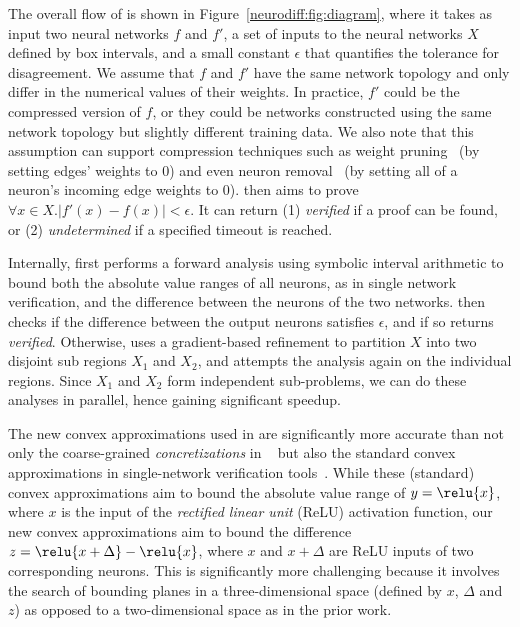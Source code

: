 The overall flow of \Name{} is shown in Figure~\ref{neurodiff:fig:diagram},
where it takes as input two neural networks $ f $ and $ f' $, a set of
inputs to the neural networks $ X $ defined by box intervals, and a small
constant $ \epsilon $ that quantifies the tolerance for disagreement. We assume
that $ f $ and $ f' $ have the same network topology and only differ in the
numerical values of their weights. In practice, $ f' $ could be the compressed
version of $ f $, or they could be networks constructed using the same network
topology but slightly different training data. We also note that this
assumption can support compression techniques such as weight
pruning~\cite{HanMD16} (by setting edges' weights to 0) and even neuron
removal~\cite{gokulanathan2019simplifying} (by setting all of a neuron's
incoming edge weights to 0). \Name{} then aims to prove $
\forall
x \in X. |f'(x) - f(x)| < \epsilon $. It can return
(1) \emph{verified} if a proof can be found, or
(2) \emph{undetermined} if a specified timeout is reached.


Internally, \Name{} first performs a forward analysis using symbolic
interval arithmetic to bound both the absolute value ranges of all
neurons, as in single network verification, and the difference between
the neurons of the two networks. \Name{} then checks if the difference
between the output neurons satisfies $ \epsilon $, and if so
returns \emph{verified}. Otherwise,
\Name{} uses a gradient-based refinement to partition $ X
$ into two disjoint sub regions $ X_1 $ and $ X_2 $, and attempts the
analysis again on the individual regions. Since $ X_1 $ and $ X_2 $
form independent sub-problems, we can do these analyses in parallel,
hence gaining significant speedup.


The new convex approximations used in \Name{} are significantly more
accurate than not only the coarse-grained \emph{concretizations}
in \ReluDiff{}~\cite{PaulsenWW20} but also the standard convex
approximations in single-network verification tools~\cite{SinghGPV19,
Singh2019krelu, WangPWYJ18nips, zhang2018efficient}.
%
While these (standard) convex approximations aim to bound the absolute
value range of $ y = \relu{x} $, where $x$ is the input of
the \textit{rectified linear unit} (ReLU) activation function, our new
convex approximations aim to bound the difference $ z = \relu{x
+ \Delta} - \relu{x} $, where $x$ and $x+\Delta$ are ReLU inputs of
two corresponding neurons.
%
This is significantly more challenging because it involves the search
of bounding planes in a three-dimensional space (defined by $x$,
$\Delta$ and $z$) as opposed to a two-dimensional space as in the
prior work.


